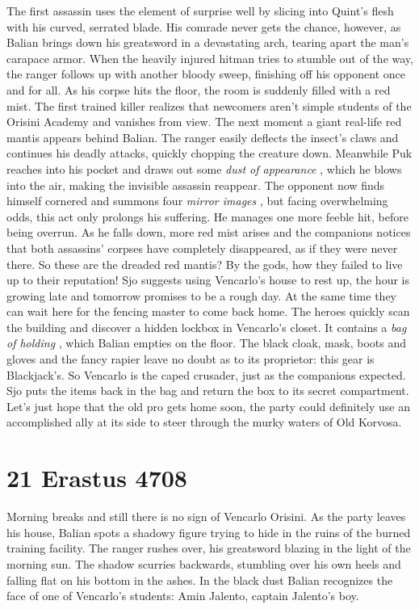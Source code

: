 The first assassin uses the element of surprise well by slicing into Quint's flesh with his curved, serrated blade. His comrade never gets the chance, however, as Balian brings down his greatsword in a devastating arch, tearing apart the man's carapace armor. When the heavily injured hitman tries to stumble out of the way, the ranger follows up with another bloody sweep, finishing off his opponent once and for all. As his corpse hits the floor, the room is suddenly filled with a red mist. The first trained killer realizes that newcomers aren't simple students of the Orisini Academy and vanishes from view. The next moment a giant real-life red mantis appears behind Balian. The ranger easily deflects the insect's claws and continues his deadly attacks, quickly chopping the creature down. Meanwhile Puk reaches into his pocket and draws out some {\itshape dust of appearance} , which he blows into the air, making the invisible assassin reappear. The opponent now finds himself cornered and summons four  {\itshape mirror images} , but facing overwhelming odds, this act only prolongs his suffering. He manages one more feeble hit, before being overrun. As he falls down, more red mist arises and the companions notices that both assassins' corpses have completely disappeared, as if they were never there. So these are the dreaded red mantis? By the gods, how they failed to live up to their reputation! Sjo suggests using Vencarlo's house to rest up, the hour is growing late and tomorrow promises to be a rough day. At the same time they can wait here for the fencing master to come back home. The heroes quickly scan the building and discover a hidden lockbox in Vencarlo's closet. It contains a {\itshape bag of holding} , which Balian empties on the floor. The black cloak, mask, boots and gloves and the fancy rapier leave no doubt as to its proprietor: this gear is Blackjack's. So Vencarlo is the caped crusader, just as the companions expected. Sjo puts the items back in the bag and return the box to its secret compartment. Let's just hope that the old pro gets home soon, the party could definitely use an accomplished ally at its side to steer through the murky waters of Old Korvosa. \section{21 Erastus 4708}

Morning breaks and still there is no sign of Vencarlo Orisini. As the party leaves his house, Balian spots a shadowy figure trying to hide in the ruins of the burned training facility. The ranger rushes over, his greatsword blazing in the light of the morning sun. The shadow scurries backwards, stumbling over his own heels and falling flat on his bottom in the ashes. In the black dust Balian recognizes the face of one of Vencarlo's students: Amin Jalento, captain Jalento's boy.\\

